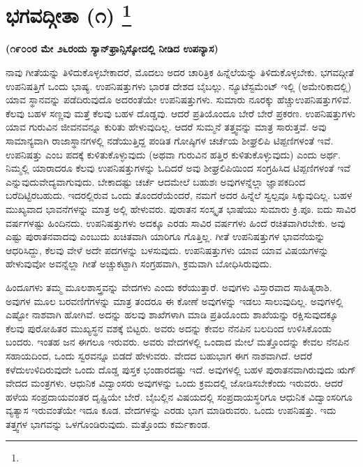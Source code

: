 
\chapter[ಭಾಗವದ್ಗೀತಾ (೧) ]{ಭಗವದ್ಗೀತಾ (೧) \protect\footnote{}}

\centerline{\textbf{(೧೯೦೦ರ ಮೇ ೨೬ರಂದು ಸ್ಯಾನ್​ಫ್ರಾನ್ಸಿಸ್ಕೋದಲ್ಲಿ ನೀಡಿದ ಉಪನ್ಯಾಸ)}}

ನಾವು ಗೀತೆಯನ್ನು ತಿಳಿದುಕೊಳ್ಳಬೇಕಾದರೆ, ಮೊದಲು ಅದರ ಚಾರಿತ್ರಿಕ ಹಿನ್ನೆಲೆಯನ್ನು ತಿಳಿದುಕೊಳ್ಳಬೇಕು. ಭಗವದ್ಗೀತೆ ಉಪನಿಷತ್ತಿಗೆ ಒಂದು ಭಾಷ್ಯ. ಉಪನಿಷತ್ತುಗಳು ಭಾರತ ದೇಶದ ಬೈಬಲ್ಲು. ನ್ಯೂಟೆಸ್ಟಮೆಂಟ್​ ಇಲ್ಲಿ (ಅಮೇರಿಕಾದಲ್ಲಿ) ಯಾವ ಸ್ಥಾನವನ್ನು ಪಡೆದಿರುವುದೊ ಅದರಂತೆಯೇ ಉಪನಿಷತ್ತುಗಳು. ಸುಮಾರು ನೂರಕ್ಕು ಹೆಚ್ಚು\break ಉಪನಿಷತ್ತುಗಳಿವೆ. ಕೆಲವು ಬಹಳ ಸಣ್ಣವು ಮತ್ತೆ ಕೆಲವು ಬಹಳ ದೊಡ್ಡವು. ಆದರೆ ಪ್ರತಿಯೊಂದೂ ಬೇರೆ ಬೇರೆ ಪ್ರಕರಣ. ಉಪನಿಷತ್ತುಗಳು ಯಾವ ಗುರುವಿನ ಜೀವನವನ್ನೂ ಕುರಿತು ಹೇಳುವುದಿಲ್ಲ. ಆದರೆ ಸುಮ್ಮನೆ ತತ್ತ್ವವನ್ನು ಮಾತ್ರ ಸಾರುತ್ತವೆ. ಅವು ಸಾಮಾನ್ಯವಾಗಿ ರಾಜಾಸ್ಥಾನಗಳಲ್ಲಿ ನಡೆಯುತ್ತಿದ್ದ ಪಂಡಿತ ಗೋಷ್ಠಿಗಳ ಚರ್ಚೆಯ ಶೀಘ್ರಲಿಪಿ ಟಿಪ್ಪಣಿಗಳಂತೆ ಇವೆ. ಉಪನಿಷತ್ತು ಎಂಬ ಪದಕ್ಕೆ ಕುಳಿತುಕೊಳ್ಳುವುದು (ಅಥವಾ ಗುರುವಿನ ಹತ್ತಿರ ಕುಳಿತುಕೊಳ್ಳುವುದು) ಎಂದು ಅರ್ಥ. ನಿಮ್ಮಲ್ಲಿ ಯಾರಾದರೂ ಕೆಲವು ಉಪನಿಷತ್ತುಗಳನ್ನು ಓದಿದರೆ ಅವು ಶೀಘ್ರಲಿಪಿಯಿಂದ ಸಂಗ್ರಹಿಸಿದ ಟಿಪ್ಪಣಿಗಳಂತೆ ಇವೆ ಎನ್ನುವುದು\break ವೇದ್ಯವಾಗುವುದು. ಬೇಕಾದಷ್ಟು ಚರ್ಚೆ ಆದಮೇಲೆ ಬಹುಶಃ ಅವುಗಳನ್ನೆಲ್ಲಾ ಜ್ಞಾಪಕದಿಂದ ಬರೆದಿಟ್ಟಿರಬಹುದು. ಇದರಲ್ಲಿರುವ ಒಂದು ತೊಂದರೆಯೆಂದರೆ, ನಮಗೆ ಅದರ ಹಿನ್ನೆಲೆ ಸ್ವಲ್ಪವೂ ಸಿಕ್ಕುವುದಿಲ್ಲ. ಬಹಳ ಮುಖ್ಯವಾದ ಭಾವನೆಗಳನ್ನು ಮಾತ್ರ ಅಲ್ಲಿ ಹೇಳುವರು. ಪುರಾತನ ಸಂಸ್ಕೃತ ಭಾಷೆಯು ಸುಮಾರು ಕ್ರಿ.ಪೂ. ಐದು ಸಾವಿರ ವರ್ಷಗಳಷ್ಟು ಹಿಂದಿನದು. ಉಪನಿಷತ್ತುಗಳು ಅದಕ್ಕೂ ಎರಡು ಸಾವಿರ ವರ್ಷಗಳು ಹಿಂದೆ ರಚಿತವಾಗಿರಬೇಕು. ಅವು ಎಷ್ಟು ಪುರಾತನವಾದವು ಎಂಬುದು ಖಚಿತವಾಗಿ ಯಾರಿಗೂ ಗೊತ್ತಿಲ್ಲ. ಗೀತೆ ಉಪನಿಷತ್ತುಗಳ ಭಾವನೆಯನ್ನು ಆಧರಿಸಿದ್ದು, ಕೆಲವು ವೇಳೆ ಅದೇ ಪದಗಳನ್ನು ಬಳಸುವುದು. ಉಪನಿಷತ್ತುಗಳು ಯಾವ ಯಾವ ವಿಷಯಗಳನ್ನು ಹೇಳುವುವೋ ಅವನ್ನೆಲ್ಲಾ ಗೀತೆ ಅಚ್ಚುಕಟ್ಟಾಗಿ ಸಂಗ್ರಹವಾಗಿ, ಕ್ರಮವಾಗಿ ಬೋಧಿಸಿರುವುದು.

ಹಿಂದೂಗಳು ತಮ್ಮ ಮೂಲಶಾಸ್ತ್ರವನ್ನು ವೇದಗಳು ಎಂದು ಕರೆಯುತ್ತಾರೆ. ಅವುಗಳು ವಿಸ್ತಾರವಾದ ಸಾಹಿತ್ಯರಾಶಿ. ಅವುಗಳ ಮೂಲ ಬರವಣಿಗೆಗಳನ್ನು ಮಾತ್ರ ತಂದರೂ ಈ ಕೋಣೆ ಅವುಗಳನ್ನು ಇಡಲು ಸಾಲುವುದಿಲ್ಲ. ಅವುಗಳಲ್ಲಿ ಎಷ್ಟೋ ನಾಶವಾಗಿ ಹೋಗಿವೆ. ಅದನ್ನು ಹಲವು ಶಾಖೆಗಳಾಗಿ ಮಾಡಿ ಪ್ರತಿಯೊಂದು ಶಾಖೆಯನ್ನು ರಕ್ಷಿಸುವುದಕ್ಕೂ ಕೆಲವು ಪುರೋಹಿತರ ಮುಖ್ಯಸ್ಥನ ವಶಕ್ಕೆ ಬಿಟ್ಟರು. ಅವರು ಅದನ್ನು ಕೇವಲ ನೆನಪಿನ ಬಲದಿಂದ ಉಳಿಸಿಕೊಂಡು ಬಂದರು. ಇಂತಹ ಜನ ಈಗಲೂ ಇರುವರು. ಅವರು ವೇದಗಳಲ್ಲಿ ಒಂದಾದ ಮೇಲೆ ಮತ್ತೊಂದನ್ನು ಕೇವಲ ನೆನಪಿನ ಸಹಾಯದಿಂದ, ಒಂದು ಸ್ವರವನ್ನೂ ಬಿಡದೆ ಹೇಳುವರು. ವೇದದ ಬಹುಭಾಗ ಈಗ ನಾಶವಾಗಿದೆ. ಆದರೆ ಕಳೆದು\break ಉಳಿದಿರುವುದೇ ಒಂದು ದೊಡ್ಡ ಪುಸ್ತಕ ಭಂಡಾರದಷ್ಟು ಇದೆ. ಅವುಗಳಲ್ಲಿ ಬಹಳ ಪುರಾತನವಾಗಿರುವುದು ಋಗ್​ ವೇದದ ಮಂತ್ರಗಳು. ಆಧುನಿಕ ವಿದ್ವಾಂಸರು ಅವುಗಳನ್ನು ಒಂದು ಕ್ರಮದಲ್ಲಿ ಜೋಡಿಸಬೇಕೆಂದು ಇರುವರು. ಆದರೆ ಹಳೆಯ ಸಂಪ್ರದಾಯವಂತರ ದೃಷ್ಟಿಯೇ ಬೇರೆ. ಬೈಬಲ್ಲಿನ ವಿಷಯದಲ್ಲಿ ಸಂಪ್ರದಾಯಸ್ಥರಿಗೂ ಆಧುನಿಕ ವಿದ್ವಾಂಸರಿಗೂ ವ್ಯತ್ಯಾಸ ಇರುವಂತೆಯೇ ಇದೂ ಕೂಡ. ವೇದಗಳನ್ನು ಎರಡು ಭಾಗ ಮಾಡಿರುವರು. ಒಂದು ಉಪನಿಷತ್ತು. ಇದು ತತ್ತ್ವಗಳ ಭಾಗವನ್ನು ಒಳಗೊಂಡಿರುವುದು. ಮತ್ತೊಂದು ಕರ್ಮಕಾಂಡ.

